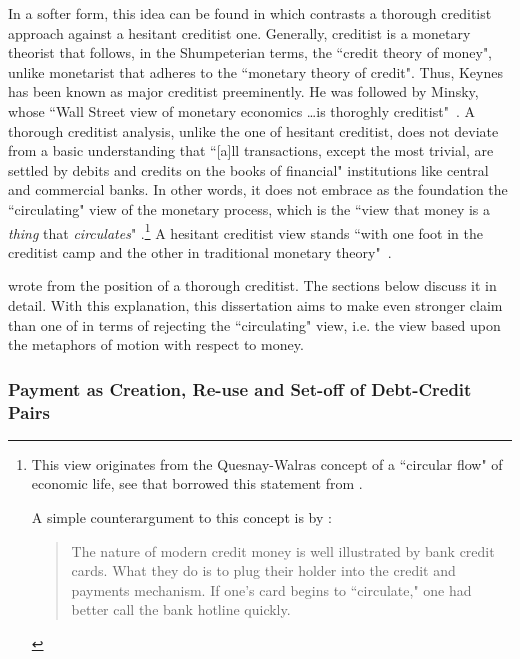 In a softer form, this idea can be found in \cite{earley1994} which contrasts a thorough creditist approach against a hesitant creditist one. Generally, creditist is a monetary theorist that follows, in the Shumpeterian terms, the ``credit theory of money", unlike monetarist that adheres to the ``monetary theory of credit". Thus, Keynes has been known as major creditist preeminently. He was followed by Minsky, whose ``Wall Street view of monetary economics \dots is thoroghly creditist"~\citep[p.~338]{earley1994}. A thorough creditist analysis, unlike the one of hesitant creditist, does not deviate from a basic understanding that ``[a]ll transactions, except the most trivial, are settled by debits and credits on the books of financial" institutions like central and commercial banks. In other words, it does not embrace as the foundation the ``circulating" view of the monetary process, which is the ``view that money is a \textit{thing} that \textit{circulates}" \citep[pp.~344,346, emphasis original]{earley1994}.\footnote{This view originates from the Quesnay-Walras concept of a ``circular flow" of economic life, see \citep[p.~344]{earley1994} that borrowed this statement from \citep[p.~112]{marget1951}.\par A simple counterargument to this concept is by \citeauthor{earley1994}: \begin{quote}The nature of modern credit money is well illustrated by bank credit cards. What they do is to plug their holder into the credit and payments mechanism. If one's card begins to ``circulate," one had better call the bank hotline quickly.~\citep[p.~347]{earley1994}\end{quote}} A hesitant creditist view stands ``with one foot in the creditist camp and the other in traditional monetary theory"~\citep[p.~339]{earley1994}.

\citeauthor{innes1913} wrote from the position of a thorough creditist. The sections below discuss it in detail. With this explanation, this dissertation aims to make even stronger claim than one of \cite{earley1994} in terms of rejecting the ``circulating" view, i.e. the view based upon the metaphors of motion with respect to money.

\subsubsection{Payment as Creation, Re-use and Set-off of Debt-Credit Pairs}\label{sec:payment}


